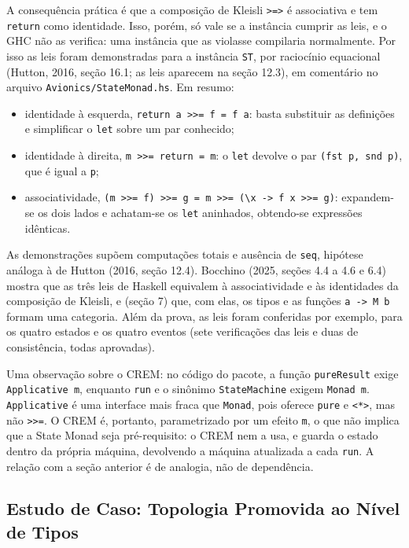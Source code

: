 \documentclass[12pt,a4paper]{article}
\begin{document}
A consequência prática é que a composição de Kleisli \texttt{>=>} é associativa e tem \texttt{return} como identidade. Isso, porém, só vale se a instância cumprir as leis, e o GHC não as verifica: uma instância que as violasse compilaria normalmente. Por isso as leis foram demonstradas para a instância \texttt{ST}, por raciocínio equacional (Hutton, 2016, seção 16.1; as leis aparecem na seção 12.3), em comentário no arquivo \texttt{Avionics/StateMonad.hs}. Em resumo:

\begin{itemize}
\item identidade à esquerda, \texttt{return a >>= f = f a}: basta substituir as definições e simplificar o \texttt{let} sobre um par conhecido;
\item identidade à direita, \texttt{m >>= return = m}: o \texttt{let} devolve o par \texttt{(fst p, snd p)}, que é igual a \texttt{p};
\item associatividade, \texttt{(m >>= f) >>= g = m >>= (\textbackslash x -> f x >>= g)}: expandem-se os dois lados e achatam-se os \texttt{let} aninhados, obtendo-se expressões idênticas.
\end{itemize}

As demonstrações supõem computações totais e ausência de \texttt{seq}, hipótese análoga à de Hutton (2016, seção 12.4). Bocchino (2025, seções 4.4 a 4.6 e 6.4) mostra que as três leis de Haskell equivalem à associatividade e às identidades da composição de Kleisli, e (seção 7) que, com elas, os tipos e as funções \texttt{a -> M b} formam uma categoria. Além da prova, as leis foram conferidas por exemplo, para os quatro estados e os quatro eventos (sete verificações das leis e duas de consistência, todas aprovadas).

Uma observação sobre o CREM: no código do pacote, a função \texttt{pureResult} exige \texttt{Applicative m}, enquanto \texttt{run} e o sinônimo \texttt{StateMachine} exigem \texttt{Monad m}. \texttt{Applicative} é uma interface mais fraca que \texttt{Monad}, pois oferece \texttt{pure} e \texttt{<*>}, mas não \texttt{>>=}. O CREM é, portanto, parametrizado por um efeito \texttt{m}, o que não implica que a State Monad seja pré-requisito: o CREM nem a usa, e guarda o estado dentro da própria máquina, devolvendo a máquina atualizada a cada \texttt{run}. A relação com a seção anterior é de analogia, não de dependência.

\subsection{Estudo de Caso: Topologia Promovida ao Nível de Tipos}
\end{document}
